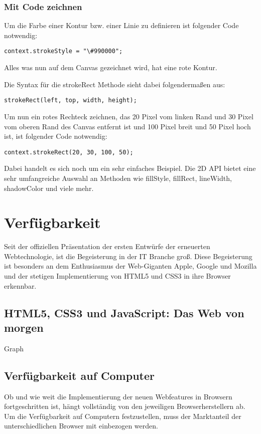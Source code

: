 \subsubsection{Mit Code zeichnen}
Um die Farbe einer Kontur bzw. einer Linie zu definieren ist folgender
Code notwendig:
\begin{verbatim}
context.strokeStyle = "\#990000";
\end{verbatim}
Alles was nun auf dem Canvas gezeichnet wird, hat eine rote Kontur.

Die Syntax für die strokeRect Methode sieht dabei folgendermaßen aus:
\begin{verbatim}
strokeRect(left, top, width, height);
\end{verbatim}
Um nun ein rotes Rechteck zeichnen, das 20 Pixel vom linken Rand und
30 Pixel vom oberen Rand des Canvas entfernt ist und 100 Pixel breit und
50 Pixel hoch ist, ist folgender Code notwendig:
\begin{lstlisting}
context.strokeRect(20, 30, 100, 50);
\end{lstlisting}
Dabei handelt es sich noch um ein sehr einfaches Beispiel. Die 2D API
bietet eine sehr umfangreiche Auswahl an Methoden wie
fillStyle, fillRect, lineWidth, shadowColor und viele mehr.
\newline\newline


\section{Verfügbarkeit}
Seit der offiziellen Präsentation der ersten Entwürfe der erneuerten
Webtechnologie, ist die Begeisterung in der IT Branche groß. Diese Begeisterung
ist besonders an dem Enthusiasmus der Web-Giganten Apple, Google und Mozilla und
der stetigen Implementierung von HTML5 und CSS3 in ihre Browser erkennbar.

\subsection{HTML5, CSS3 und JavaScript: Das Web von morgen}
Graph

\subsection{Verfügbarkeit auf Computer}
Ob und wie weit die Implementierung der neuen Webfeatures in Browsern
fortgeschritten ist, hängt vollständig von den jeweiligen Browserherstellern ab.
Um die Verfügbarkeit auf Computern festzustellen, muss der Marktanteil der
unterschiedlichen Browser mit einbezogen werden.


